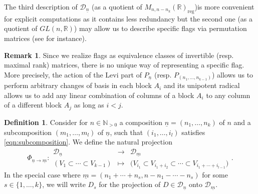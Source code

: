 \documentclass[pdftex]{sigma}
\numberwithin{equation}{section}
\theoremstyle{definition}
\newtheorem{Definition}[Theorem]{Definition}
\newtheorem{Remark}[Theorem]{Remark}
\newcommand{\R}{\mathbb{R}}
\newcommand{\N}{\mathbb{N}}
\newcommand{\D}{\mathcal{D}}
\theoremstyle{plain}
\theoremstyle{plain}
\theoremstyle{plain}
\theoremstyle{plain}
\begin{document}

The third description of $\D_{\underline n}$ (as a quotient of $M_{n,n-n_k}(\R)_{\mathrm{reg}}$)is more convenient for explicit computations as it contains less redundancy but the second one (as a quotient of $GL(n,\R)$) may allow us to describe specific flags via permutation matrices (see  for instance).

\begin{Remark}
	Since we realize flags as equivalence classes of invertible (resp. maximal rank) matrices, there is no unique way of representing a specific flag. More precisely, the action of the Levi part of $P_{\underline n}$ (resp. $P_{(n_1,\dots,n_{k-1})}$) allows us to perform arbitrary changes of basis in each block $A_i$ and its unipotent radical allows us to add any linear combination of columns of a block $A_i$ to any column of a different block $A_j$ as long as $i < j$.
\end{Remark}

\begin{Definition}{\label{def projections}}
	Consider for $n \in \N_{>0}$ a composition $\underline n = (n_1,\dots,n_k)$ of $n$ and a subcomposition $(m_1,\dots, m_l)$ of $\underline n$, such that $(i_1,\dots,i_l)$ satisfies \eqref{eqn:subcomposition}. We define the natural projection
	\begin{equation*}
		\Phi_{\underline n \to \underline m} : \begin{array}{ccc}
		\D_{\underline n} & \to & \D_{\underline m} \\
		(V_1 \subset \cdots \subset V_{k-1}) & \mapsto & \displaystyle \Big(V_{i_1} \subset V_{i_1+i_2} \subset \cdots \subset V_{i_1+\cdots+i_{l-1}}\Big)
	\end{array}.
	\end{equation*}
	In the special case where $\underline m = (n_1+\cdots + n_s,n-n_1-\cdots-n_s)$ for some $s \in \{1,\dots,k\}$, we will write $D_s$ for the projection of $D \in \D_{\underline n}$ onto $\D_{\underline m}$.
\end{Definition}
\end{document}
